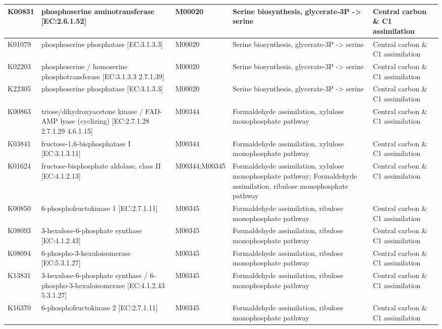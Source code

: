 {\begin{longtable}{|l|p{4.5cm}|p{2.3cm}|p{3.7cm}|p{2.5cm}|}
K00831 & phosphoserine aminotransferase [EC:2.6.1.52] & M00020 & Serine biosynthesis, glycerate-3P -> serine & Central carbon \& C1 assimilation \\ \hline
K01079 & phosphoserine phosphatase [EC:3.1.3.3] & M00020 & Serine biosynthesis, glycerate-3P -> serine & Central carbon \& C1 assimilation \\ \hline
K02203 & phosphoserine / homoserine phosphotransferase [EC:3.1.3.3 2.7.1.39] & M00020 & Serine biosynthesis, glycerate-3P -> serine & Central carbon \& C1 assimilation \\ \hline
K22305 & phosphoserine phosphatase [EC:3.1.3.3] & M00020 & Serine biosynthesis, glycerate-3P -> serine & Central carbon \& C1 assimilation \\ \hline
K00863 & triose/dihydroxyacetone kinase / FAD-AMP lyase (cyclizing) [EC:2.7.1.28 2.7.1.29 4.6.1.15] & M00344 & Formaldehyde assimilation, xylulose monophosphate pathway & Central carbon \& C1 assimilation \\ \hline
K03841 & fructose-1,6-bisphosphatase I [EC:3.1.3.11] & M00344 & Formaldehyde assimilation, xylulose monophosphate pathway & Central carbon \& C1 assimilation \\ \hline
K01624 & fructose-bisphosphate aldolase, class II [EC:4.1.2.13] & M00344;M00345 & Formaldehyde assimilation, xylulose monophosphate pathway; Formaldehyde assimilation, ribulose monophosphate pathway & Central carbon \& C1 assimilation \\ \hline
K00850 & 6-phosphofructokinase 1 [EC:2.7.1.11] & M00345 & Formaldehyde assimilation, ribulose monophosphate pathway & Central carbon \& C1 assimilation \\ \hline
K08093 & 3-hexulose-6-phosphate synthase [EC:4.1.2.43] & M00345 & Formaldehyde assimilation, ribulose monophosphate pathway & Central carbon \& C1 assimilation \\ \hline
K08094 & 6-phospho-3-hexuloisomerase [EC:5.3.1.27] & M00345 & Formaldehyde assimilation, ribulose monophosphate pathway & Central carbon \& C1 assimilation \\ \hline
K13831 & 3-hexulose-6-phosphate synthase / 6-phospho-3-hexuloisomerase [EC:4.1.2.43 5.3.1.27] & M00345 & Formaldehyde assimilation, ribulose monophosphate pathway & Central carbon \& C1 assimilation \\ \hline
K16370 & 6-phosphofructokinase 2 [EC:2.7.1.11] & M00345 & Formaldehyde assimilation, ribulose monophosphate pathway & Central carbon \& C1 assimilation \\ \hline

\end{longtable}}
